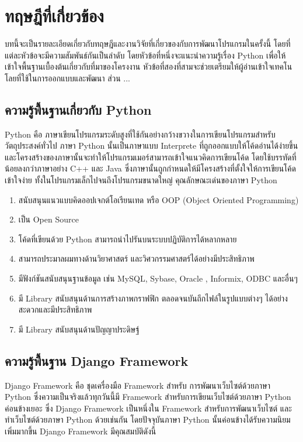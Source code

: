 \chapter{ทฤษฎีที่เกี่ยวข้อง}
บทนี้จะเป็นรายละเอียดเกี่ยวกับทฤษฎีและงานวิจัยที่เกี่ยวของกับการพัฒนาโปรแกรมในครั้งนี้ โดยที่แต่ละหัวข้อจะมีความสัมพันธ์กันเป็นลำดับ โดยหัวข้อที่หนึ่งจะแนะนำความรู้เรื่อง Python เพื่อให้เข้าใจพื้นฐานเบื้องต้นเกี่ยวกับที่มาของโครงงาน หัวข้อที่สองที่สามจะช่วยเตรียมให้ผู้อ่านเข้าใจเทคโนโลยที่ใช้ในการออกแบบและพัฒนา ส่วน ...

\section{ความรู้พื้นฐานเกี่ยวกับ Python}
	Python  คือ ภาษาเขียนโปรแกรมระดับสูงที่ใช้กันอย่างกว้างขวางในการเขียนโปรแกรมสำหรับวัตถุประสงค์ทั่วไป ภาษา Python นั้นเป็นภาษาแบบ Interprete ที่ถูกออกแบบให้โค้ดอ่านได้ง่ายขึ้น และโครงสร้างของภาษานั้นจะทำให้โปรแกรมเมอร์สามารถเข้าใจแนวคิดการเขียนโค้ด โดยใช้บรรทัดที่น้อยลงกว่าภาษาอย่าง C++ และ Java ซึ่งภาษานั้นถูกกำหนดให้มีโครงสร้างที่ตั้งใจให้การเขียนโค้ดเข้าใจง่าย ทั้งในโปรแกรมเล็กไปจนถึงโปรแกรมขนาดใหญ่ คุณลักษณะเด่นของภาษา Python 
    \begin{enumerate}
    	\item สนับสนุนแนวแบบคิดออปเจกต์โอเรียนเทด หรือ OOP (Object Oriented Programming)
    	\item เป็น Open Source
    	\item โค้ดที่เขียนด้วย Python สามารถนำไปรันบนระบบปฏิบัติการได้หลากหลาย
    	\item สามารถประมาลผมทางด้านวิยาศาสตร์ และวิศวกรรมศาสตร์ได้อย่างมีประสิทธิภาพ
    	\item มีฟังก์ชันสนับสนุนฐานข้อมูล เช่น MySQL, Sybase, Oracle , Informix, ODBC และอื่นๆ
    	\item มี Library สนับสนุนด้านการสร้างภาพกราฟฟิก ตลอดจนบันถึกไฟล์ในรูปแบบต่างๆ ได้อย่างสะดวกและมีประสิทธิภาพ
    	\item มี Library สนับสนุนด้านปัญญาประดิษฐ์
    \end{enumerate}
    

	\section{ความรู้พื้นฐาน Django Framework}
	Django Framework  คือ ชุดเครื่องมือ Framework สำหรับ การพัฒนาเว็บไซต์ด้วยภาษา Python ซึ่งความเป็นจริงแล้วทุกวันนี้มี Framework สำหรับการเขียนเว็บไซต์ด้วยภาษา Python ค่อนข้างเยอะ ซึ่ง Django Framework เป็นหนึ่งใน Framework สำหรับการพัฒนาเว็บไซต์ และทำเว็บไซต์ด้วยภาษา Python ด้วยเช่นกัน โดยปัจจุบันภาษา Python นั้นค่อนข้างได้รับความนิยมเพิ่มมากขึ้น  Django Framework \cite{django} มีคุณสมบัติดังนี้
	
